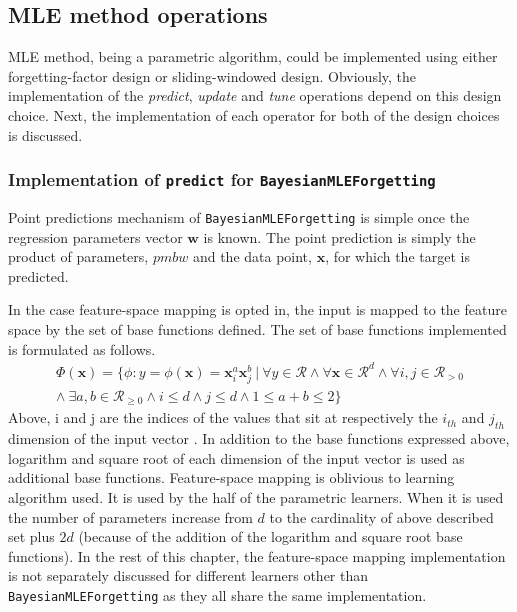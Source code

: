 \subsection{MLE method operations}

MLE method, being a parametric algorithm, could be implemented using either forgetting-factor design or sliding-windowed design. Obviously, the implementation of the \textit{predict}, \textit{update} and \textit{tune} operations depend on this design choice. Next, the implementation of each operator for both of the design choices is discussed.

\subsubsection{Implementation of \texttt{predict} for \texttt{BayesianMLEForgetting}}
\label{subsubsection:impl_predict_mleforgetting}

Point predictions mechanism of \texttt{BayesianMLEForgetting} is simple once the regression parameters vector $\pmb{w}$ is known. The point prediction is simply the product of parameters, $pmb{w}$ and the data point, $\pmb{x}$, for which the target is predicted.

In the case feature-space mapping is opted in, the input is mapped to the feature space by the set of base functions defined. The set of base functions implemented is formulated as follows.
\begin{align*}
 \Phi(\pmb{x}) = \{\phi: y = \phi(\pmb{x}) = \pmb{x}_i^a\pmb{x}_j^b \ | \ \forall y \in \mathcal{R} \wedge \forall \pmb{x} \in \mathcal{R}^d \wedge \forall i,j \in \mathcal{R}_{> 0} \\ \wedge \ \exists a,b \in \mathcal{R}_{\geq 0} \wedge i \leq d \wedge j \leq d \wedge 1 \leq a+b \leq 2\}
 \end{align*}
Above, i and j are the indices of the values that sit at respectively the $i_{th}$ and $j_{th}$ dimension of the input vector . In addition to the base functions expressed above, logarithm and square root of each dimension of the input vector is used as additional base functions. Feature-space mapping is oblivious to learning algorithm used. It is used by the half of the parametric learners. When it is used the number of parameters increase from $d$ to the cardinality of above described set plus $2d$ (because of the addition of the logarithm and square root base functions). In the rest of this chapter, the feature-space mapping implementation is not separately discussed for different learners other than \texttt{BayesianMLEForgetting} as they all share the same implementation.

